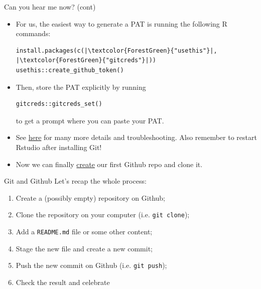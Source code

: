 \documentclass[
hyperref={bookmarks=false},
xcolor={dvipsnames,svgnames*,x11names*}, 
12pt
]{beamer}
\begin{document}
\begin{frame}[fragile]{Can you hear me now? (cont)}
\vspace{-0.5cm}
\begin{itemize}
\itemsep 2ex
\item For us, the easiest way to generate a PAT is running the following R commands: 
\begin{lstlisting}[basicstyle=\color{black}\ttfamily\scriptsize, backgroundcolor=\color{white}]
install.packages(c(|\textcolor{ForestGreen}{"usethis"}|, |\textcolor{ForestGreen}{"gitcreds"}|))
usethis::create_github_token()
\end{lstlisting}
\item Then, store the PAT explicitly by running
\begin{lstlisting}[basicstyle=\color{black}\ttfamily\scriptsize, backgroundcolor=\color{white}]
gitcreds::gitcreds_set()
\end{lstlisting} 
to get a prompt where you can paste your PAT.  
\item See \href{https://happygitwithr.com/https-pat.html}{here} for many more details and troubleshooting. Also remember to restart Rstudio after installing Git!
\item Now we can finally \href{https://github.com/new}{create} our first Github repo and clone it.
\end{itemize}
\end{frame}

\begin{frame}{Git and Github}
\vspace{-0.5cm}
Let's recap the whole process: 
\begin{enumerate}
\itemsep 2ex
\item Create a (possibly empty) repository on Github; 
\item Clone the repository on your computer (i.e. \texttt{git clone});
\item Add a \texttt{README.md} file or some other content; 
\item Stage the new file and create a new commit; 
\item Push the new commit on Github (i.e. \texttt{git push}); 
\item Check the result and celebrate   
\end{enumerate}
\end{frame}
\end{document}
